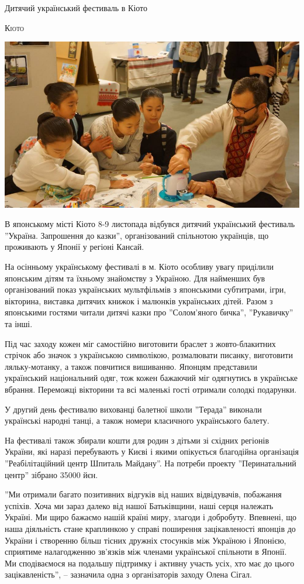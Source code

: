 \documentclass[10pt,a4paper]{article}
\newcommand{\NewsItem}[1]{%
		\usefont{T2A}{iwona}{m}{n} 
		\large #1 \vspace{4pt}
		\par \normalsize \normalfont}
\newcommand{\NewsAuthor}[1]{%
			\hfill \textsc{#1} \vspace{4pt}
			\par \normalfont}
\begin{document}
\begin{multicols}{3}

\NewsItem{Дитячий український фестиваль в Кіото}
\NewsAuthor{Кіото}
		\begin{center}
			\includegraphics[width=0.8\linewidth]{images/kids-fest-kioto}
		\end{center}
В японському місті Кіото 8-9 листопада відбувся дитячий український фестиваль ''Україна. Запрошення до казки'', організований спільнотою українців, що проживають у Японії у регіоні Кансай.

На осінньому українському фестивалі в м. Кіото особливу увагу приділили японським дітям та їхньому знайомству з Україною. Для найменших був організований показ українських мультфільмів з японськими субтитрами, ігри, вікторина, виставка дитячих книжок і малюнків українських дітей. Разом з японськими гостями читали дитячі казки про ''Солом'яного бичка'', ''Рукавичку'' та інші.

Під час заходу кожен міг самостійно виготовити браслет з жовто-блакитних стрічок або значок з українською символікою, розмалювати писанку, виготовити ляльку-мотанку, а також повчитися вишиванню. Японцям представили український національний одяг, тож кожен бажаючий міг одягнутись в українське вбрання. Переможці вікторини та всі маленькі гості отримали солодкі подарунки.

У другий день фестивалю вихованці балетної школи ''Терада'' виконали українські народні танці, а також номери класичного українського балету.

На фестивалі також збирали кошти для родин з дітьми зі східних регіонів України, які наразі перебувають у Києві і якими опікується благодійна організація ''Реабілітаційний центр Шпиталь Майдану''. На потреби проекту ''Перинатальний центр'' зібрано 35000 йєн.

''Ми отримали багато позитивних відгуків від наших відвідувачів, побажання успіхів. Хоча ми зараз далеко від нашої Батьківщини, наші серця належать Україні. Ми щиро бажаємо нашій країні миру, злагоди і добробуту. Впевнені, що наша діяльність стане краплинкою у справі поширення зацікавленості японців до України і створенню більш тісних дружніх стосунків між Україною і Японією, сприятиме налагодженню зв’язків між членами української спільноти в Японії. Ми сподіваємося на подальшу підтримку і активну участь усіх, хто має до цього зацікавленість'', – зазначила одна з організаторів заходу Олена Сігал.


\end{multicols}
\end{document}
